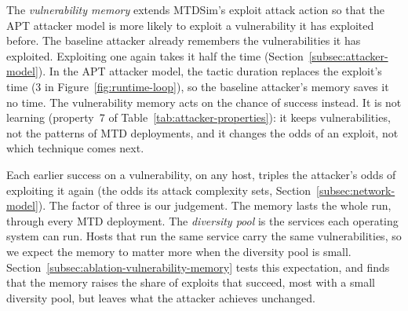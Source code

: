 \documentclass{cshonours}
\begin{document}
The \emph{vulnerability memory} extends MTDSim's exploit attack action so that
the APT attacker model is more likely to exploit a vulnerability it has
exploited before. The baseline
attacker already remembers the vulnerabilities it has exploited. Exploiting
one again takes it half the time (Section~\ref{subsec:attacker-model}). In the
APT attacker model, the tactic duration replaces the exploit's time (3 in
Figure~\ref{fig:runtime-loop}), so the baseline attacker's memory saves it
no time. The vulnerability memory acts on the chance of success instead. It is
not learning (property~7 of Table~\ref{tab:attacker-properties}): it keeps
vulnerabilities, not the patterns of MTD deployments, and it changes the odds
of an exploit, not which technique comes next.

Each earlier success on a vulnerability, on any host, triples the attacker's
odds of exploiting it again (the odds its attack complexity sets,
Section~\ref{subsec:network-model}). The factor of three is our judgement.
The memory lasts the whole run, through every MTD deployment. The \emph{diversity pool} is the services each
operating system can run. Hosts that run
the same service carry the same vulnerabilities, so we expect the memory to
matter more when the diversity pool is small.
Section~\ref{subsec:ablation-vulnerability-memory} tests this expectation,
and finds that the memory raises the share of exploits that succeed, most
with a small diversity pool, but leaves what the attacker achieves unchanged.
\end{document}
